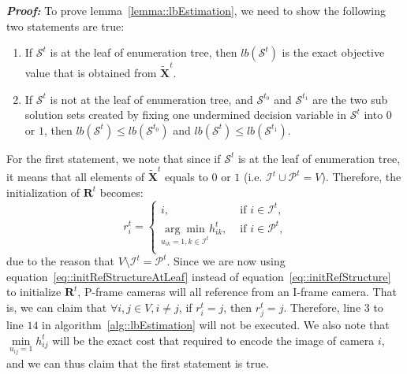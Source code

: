 \textbf{\emph{Proof:}}
To prove lemma~\ref{lemma::lbEstimation}, we need to show the following two statements are true:
\begin{enumerate}
\item If $\mathcal{S}^t$ is at the leaf of enumeration tree, then $lb(\mathcal{S}^t)$ is the exact objective value that is obtained from $\tilde{\mathbf{X}}^t$.
\item If $\mathcal{S}^t$ is not at the leaf of enumeration tree, and $\mathcal{S}^{t_0}$ and $\mathcal{S}^{t_1}$ are the two sub solution sets created by fixing one undermined decision variable in $\mathcal{S}^t$ into $0$ or $1$, then $lb(\mathcal{S}^t) \leq lb(\mathcal{S}^{t_0})$ and $lb(\mathcal{S}^t) \leq lb(\mathcal{S}^{t_1})$.
\end{enumerate}
For the first statement, we note that since if $\mathcal{S}^t$ is at the leaf of enumeration tree, it means that all elements of $\tilde{\mathbf{X}}^t$ equals to $0$ or $1$ (i.e. $\mathcal{I}^t \cup \mathcal{P}^t = V$).
Therefore, the initialization of $\mathbf{R}^t$ becomes:
\begin{equation}
r_i^t = 
\left\{ \begin{array}{cc}
i,  &\text{ if $i \in \mathcal{I}^t$,} \\                  	   
\underset{u_{ik}=1, k \in \mathcal{I}^t}{\arg\min} h_{ik}^t,  &\text{ if $i \in \mathcal{P}^t$,} \\
\end{array} \right.
\label{eq::initRefStructureAtLeaf}
\end{equation}
due to the reason that $V \setminus \mathcal{I}^t = \mathcal{P}^t$.
Since we are now using equation~\eqref{eq::initRefStructureAtLeaf} instead of equation~\eqref{eq::initRefStructure} to initialize $\mathbf{R}^t$, P-frame cameras will all reference from an I-frame camera.
That is, we can claim that $\forall i,j \in V, i \neq j$, if $r_i^t = j$, then $r_j^t = j$.
Therefore, line $3$ to line $14$ in algorithm~\ref{alg::lbEstimation} will not be executed.
We also note that $\underset{u_{ij}=1}{\min} h_{ij}^t$ will be the exact cost that required to encode the image of camera $i$, and we can thus claim that the first statement is true.

